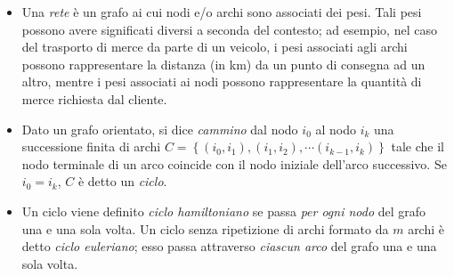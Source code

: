 \begin{itemize}
		\item Una \emph{rete} è un grafo ai cui nodi e/o archi sono associati dei pesi. Tali pesi possono avere significati diversi a seconda del contesto; ad esempio, nel caso del trasporto di merce da parte di un veicolo, i pesi associati agli archi possono rappresentare la distanza (in km) da un punto di consegna ad un altro, mentre i pesi associati ai nodi possono rappresentare la quantità di merce richiesta dal cliente.

		\item Dato un grafo orientato, si dice \emph{cammino} dal nodo $i_0$ al nodo $i_k$ una successione finita di archi $C = \left \{ (i_0, i_1),(i_1, i_2), \cdots (i_{k-1}, i_k) \right \}$ tale che il nodo terminale di un arco coincide con il nodo iniziale dell’arco successivo. Se $i_0 = i_k$, $C$ è detto un \emph{ciclo}.

		\item Un ciclo viene definito \emph{ciclo hamiltoniano} se passa \emph{per ogni nodo} del grafo una e una sola volta. Un ciclo senza ripetizione di archi formato da $m$ archi è detto \emph{ciclo euleriano}; esso passa attraverso \emph{ciascun arco} del grafo una e una sola volta. 
	\end{itemize}
